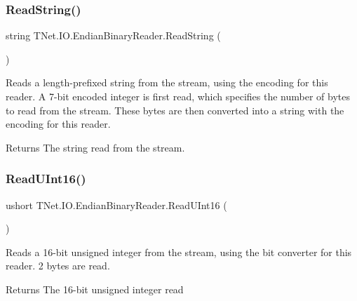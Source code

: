 \subsubsection{\texorpdfstring{Read\+String()}{ReadString()}}
{\footnotesize\ttfamily string T\+Net.\+I\+O.\+Endian\+Binary\+Reader.\+Read\+String (\begin{DoxyParamCaption}{ }\end{DoxyParamCaption})}



Reads a length-\/prefixed string from the stream, using the encoding for this reader. A 7-\/bit encoded integer is first read, which specifies the number of bytes to read from the stream. These bytes are then converted into a string with the encoding for this reader. 

\begin{DoxyReturn}{Returns}
The string read from the stream.
\end{DoxyReturn}
\mbox{\label{class_t_net_1_1_i_o_1_1_endian_binary_reader_a7c106faa6d6df6a658ed98c50b529b7b}} 
\subsubsection{\texorpdfstring{Read\+U\+Int16()}{ReadUInt16()}}
{\footnotesize\ttfamily ushort T\+Net.\+I\+O.\+Endian\+Binary\+Reader.\+Read\+U\+Int16 (\begin{DoxyParamCaption}{ }\end{DoxyParamCaption})}



Reads a 16-\/bit unsigned integer from the stream, using the bit converter for this reader. 2 bytes are read. 

\begin{DoxyReturn}{Returns}
The 16-\/bit unsigned integer read
\end{DoxyReturn}
\mbox{\label{class_t_net_1_1_i_o_1_1_endian_binary_reader_ae5a1827eb24391ffb6fac5472433cb68}} 
